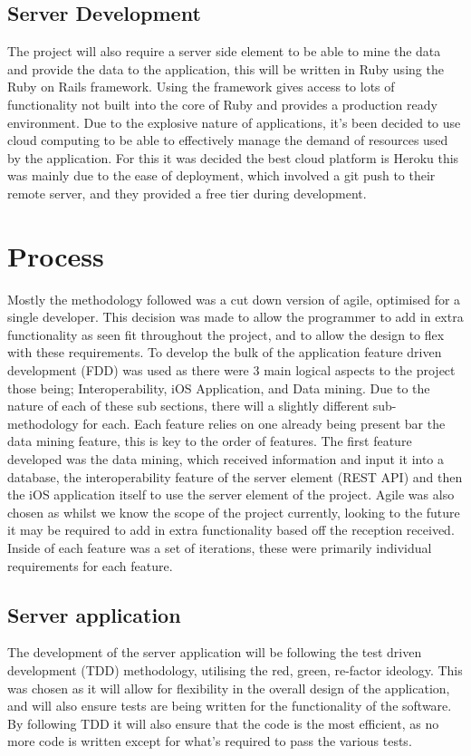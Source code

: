 	\subsection{Server Development}

	The project will also require a server side element to be able to mine the data and provide the data to the application, this will be written in Ruby using the Ruby on Rails framework. Using the framework gives access to lots of functionality not built into the core of Ruby and provides a production ready environment. Due to the explosive nature of applications, it's been decided to use cloud computing to be able to effectively manage the demand of resources used by the application. For this it was decided the best cloud platform is Heroku\cite{heroku} this was mainly due to the ease of deployment, which involved a git push to their remote server, and they provided a free tier during development. 

\section{Process}
	
	Mostly the methodology followed was a cut down version of agile, optimised for a single developer. This decision was made to allow the programmer to add in extra functionality as seen fit throughout the project, and to allow the design to flex with these requirements. To develop the bulk of the application feature driven development (FDD) was used as there were 3 main logical aspects to the project those being; Interoperability, iOS Application, and Data mining. Due to the nature of each of these sub sections, there will a slightly different sub-methodology for each. Each feature relies on one already being present bar the data mining feature, this is key to the order of features. The first feature developed was the data mining, which received information and input it into a database, the interoperability feature of the server element (REST API) and then the iOS application itself to use the server element of the project. Agile was also chosen as whilst we know the scope of the project currently, looking to the future it may be required to add in extra functionality based off the reception received. Inside of each feature was a set of iterations, these were primarily individual requirements for each feature. 

	\subsection{Server application}
		The development of the server application will be following the test driven development (TDD) methodology, utilising the red, green, re-factor ideology. This was chosen as it will allow for flexibility in the overall design of the application, and will also ensure tests are being written for the functionality of the software. By following TDD it will also ensure that the code is the most efficient, as no more code is written except for what's required to pass the various tests. 

